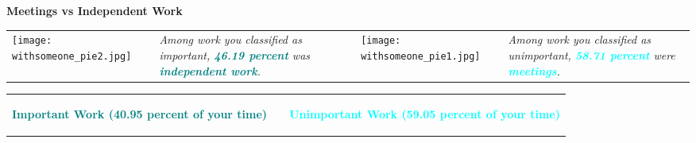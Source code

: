 \documentclass[a4paper]{article}
\begin{document}
\begin{center}
    \Large{\textbf{Meetings vs Independent Work}}
    \end{center}
    \begin{table}[h!]
     \begin{center}
     \begin{tabular}{m{4cm} m{3.5cm} m{4cm} m{3.5cm}}
     \begin {minipage} {4cm}
         \texttt{[image: withsomeone\_pie2.jpg]}
         \end{minipage}
         &
         \begin {minipage} {3.5cm}
    \large{\textit{Among work you classified as important, \textbf{\textcolor{teal}{46.19 percent}} was \textbf{\textcolor{teal}{independent work}}.}}
     \end{minipage}
      &
      \begin{minipage}{4cm}
          \texttt{[image: withsomeone\_pie1.jpg]}
            \end{minipage}
            &
       \begin{minipage}{3.5cm}
      \large{\textit{Among work you classified as unimportant, \textbf{\textcolor{cyan}{58.71 percent}} were \textbf{\textcolor{cyan}{meetings}}.}}
      \end{minipage}
      \end{tabular}
      \end{center}
      \end{table}

\newpage

\begin{table}[h!]
     \begin{center}
     \begin{tabular}{m{7cm} m{1cm} m{7cm}}
     \begin {minipage} {7cm}
          \begin{center}
      \textcolor{teal}{\textbf{\Large{Important Work (40.95 percent of your time)}}}
     \end{center}
     \end{minipage}
      & 
      \begin{minipage}{1cm}
      \end{minipage}
      &
      \begin{minipage}{7cm}
           \begin{center}
      \textcolor{cyan}{\textbf{\Large{Unimportant Work (59.05 percent of your time)}}}
      \end{center} 
      \end{minipage}
      \end{tabular}
      \end{center}
      \end{table}
  \hrulefill
\end{document}
